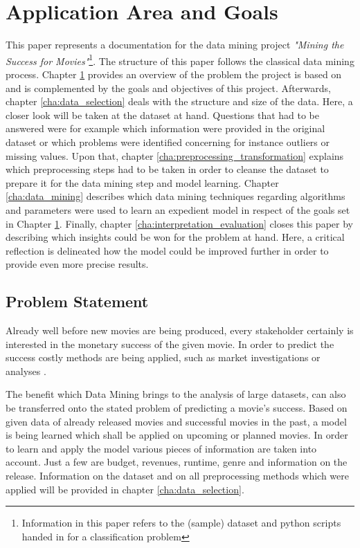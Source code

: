 \chapter{Application Area and Goals}
\label{cha:area_goals}
This paper represents a documentation for the data mining project \textit{"Mining the Success for Movies"}\footnote{ Information in this paper refers to the (sample) dataset and python scripts handed in for a classification problem}. The structure of this paper follows the classical data mining process. Chapter \ref{cha:area_goals} provides an overview of the problem the project is based on and is complemented by the goals and objectives of this project. Afterwards, chapter \ref{cha:data_selection} deals with the structure and size of the data. Here, a closer look will be taken at the dataset at hand. Questions that had to be answered were for example which information were provided in the original dataset or which problems were identified concerning for instance outliers or missing values. Upon that, chapter \ref{cha:preprocessing_transformation} explains which preprocessing steps had to be taken in order to cleanse the dataset to prepare it for the data mining step and model learning. Chapter \ref{cha:data_mining} describes which data mining techniques regarding algorithms and parameters were used to learn an expedient model in respect of the goals set in Chapter \ref{cha:area_goals}. Finally, chapter \ref{cha:interpretation_evaluation} closes this paper by describing which insights could be won for the problem at hand. Here, a critical reflection is delineated how the model could be improved further in order to provide even more precise results.

\section{Problem Statement}
Already well before new movies are being produced, every stakeholder certainly is interested in the monetary success of the given movie. In order to predict the success costly methods are being applied, such as market investigations or analyses .

The benefit which Data Mining brings to the analysis of large datasets, can also be transferred onto the stated problem of predicting a movie's success. Based on given data of already released movies and successful movies in the past, a model is being learned which shall be applied on upcoming or planned movies. In order to learn and apply the model various pieces of information are taken into account. Just a few are budget, revenues, runtime, genre and information on the release. Information on the dataset and on all preprocessing methods which were applied will be provided in chapter \ref{cha:data_selection}.

